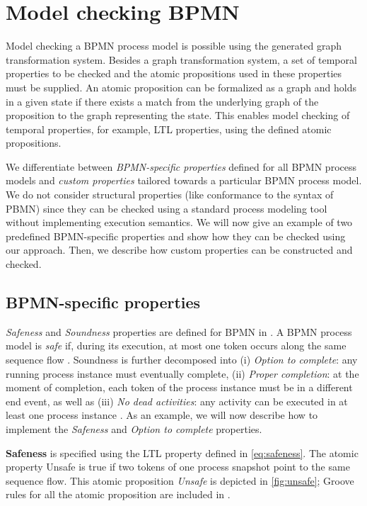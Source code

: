 \documentclass[submission, copyright, creativecommons]{eptcs}
\begin{document}
\section{Model checking BPMN} \label{sec:modelChecking}

Model checking a BPMN process model is possible using the generated graph transformation system.
Besides a graph transformation system, a set of temporal properties to be checked and the atomic propositions used in these properties must be supplied.
An atomic proposition can be formalized as a graph and holds in a given state if there exists a match from the underlying graph of the proposition to the graph representing the state.
This enables model checking of temporal properties, for example, LTL properties, using the defined atomic propositions.

We differentiate between \emph{BPMN-specific properties} defined for all BPMN process models and \emph{custom properties} tailored towards a particular BPMN process model.
We do not consider structural properties (like conformance to the syntax of PBMN) since they can be checked using a standard process modeling tool without implementing execution semantics.
We will now give an example of two predefined BPMN-specific properties and show how they can be checked using our approach.
Then, we describe how custom properties can be constructed and checked.

\subsection{BPMN-specific properties}
\textit{Safeness} and \textit{Soundness} properties are defined for BPMN in \cite{corradiniClassificationBPMNCollaborations2018}.
A BPMN process model is \emph{safe} if, during its execution, at most one token occurs along the same sequence flow \cite{corradiniClassificationBPMNCollaborations2018}.
Soundness is further decomposed into (i) \emph{Option to complete}: any running process instance must eventually complete, (ii) \emph{Proper completion}: at the moment of completion, each token of the process instance must be in a different end event, as well as (iii) \emph{No dead activities}: any activity can be executed in at least one process instance \cite{corradiniClassificationBPMNCollaborations2018}.
As an example, we will now describe how to implement the \emph{Safeness} and \emph{Option to complete} properties.

\textbf{Safeness} is specified using the LTL property defined in \eqref{eq:safeness}.
The atomic property \textsf{Unsafe} is true if two tokens of one process snapshot point to the same sequence flow. This atomic proposition \textit{Unsafe} is depicted in \cref{fig:unsafe}; Groove rules for all the atomic proposition are included in \cite{timkrauterArtifactsTERMGRAPH2022}.
\end{document}
